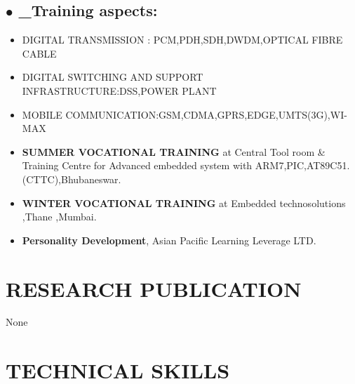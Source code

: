 \documentclass{article}
\begin{document}
\subsection{$\bullet$ \_Training aspects:}
\begin{itemize} \item DIGITAL TRANSMISSION : PCM,PDH,SDH,DWDM,OPTICAL FIBRE CABLE \end{itemize}
 \begin{itemize} \item  DIGITAL SWITCHING AND SUPPORT INFRASTRUCTURE:DSS,POWER PLANT \end{itemize}
 \begin{itemize} \item MOBILE COMMUNICATION:GSM,CDMA,GPRS,EDGE,UMTS(3G),WI-MAX \end{itemize}


 \begin{itemize}
 \item \textbf{SUMMER VOCATIONAL TRAINING} at Central Tool room \& Training Centre for Advanced embedded system with ARM7,PIC,AT89C51.(CTTC),Bhubaneswar.
\end{itemize}




 \begin{itemize}
 \item \textbf{WINTER VOCATIONAL TRAINING} at Embedded technosolutions ,Thane ,Mumbai.
\end{itemize}
\begin{itemize}
 \item \textbf{Personality Development}, Asian Pacific Learning Leverage LTD.
\end{itemize}
\section{RESEARCH PUBLICATION}
None
\section{TECHNICAL SKILLS}
\end{document}
